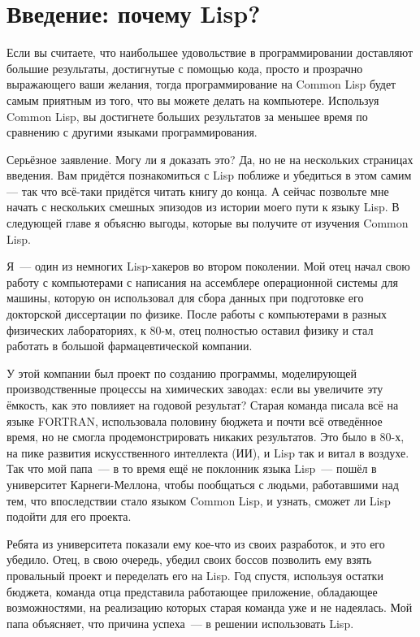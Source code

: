 \chapter{Введение: почему Lisp?}
\label{ch:01}

Если вы считаете, что наибольшее удовольствие в программировании доставляют большие
результаты, достигнутые с помощью кода, просто и прозрачно выражающего ваши желания, тогда
программирование на Common Lisp будет самым приятным из того, что вы можете делать на
компьютере. Используя Common Lisp, вы достигнете больших результатов за меньшее время по
сравнению с другими языками программирования.

Серьёзное заявление. Могу ли я доказать это? Да, но не на нескольких страницах
введения. Вам придётся познакомиться с Lisp поближе и убедиться в этом самим — так что
всё-таки придётся читать книгу до конца. А сейчас позвольте мне начать с нескольких
смешных эпизодов из истории моего пути к языку Lisp. В следующей главе я объясню выгоды,
которые вы получите от изучения Common Lisp.

Я~--- один из немногих Lisp-хакеров во втором поколении. Мой отец начал свою работу с
компьютерами с написания на ассемблере операционной системы для машины, которую он
использовал для сбора данных при подготовке его докторской диссертации по физике. После
работы с компьютерами в разных физических лабораториях, к 80-м, отец полностью оставил
физику и стал работать в большой фармацевтической компании.

У этой компании был проект по созданию программы, моделирующей производственные процессы
на химических заводах: если вы увеличите эту ёмкость, как это повлияет на годовой
результат? Старая команда писала всё на языке FORTRAN, использовала половину бюджета и
почти всё отведённое время, но не смогла продемонстрировать никаких результатов. Это было в
80-х, на пике развития искусственного интеллекта (ИИ), и Lisp так и витал в воздухе. Так что
мой папа~--- в то время ещё не поклонник языка Lisp~--- пошёл в университет Карнеги-Меллона,
чтобы пообщаться с людьми, работавшими над тем, что впоследствии стало языком Common Lisp, и
узнать, сможет ли Lisp подойти для его проекта.

Ребята из университета показали ему кое-что из своих разработок, и это его убедило. Отец,
в свою очередь, убедил своих боссов позволить ему взять провальный проект и переделать его на
Lisp. Год спустя, используя остатки бюджета, команда отца представила работающее
приложение, обладающее возможностями, на реализацию которых старая команда уже и не
надеялась. Мой папа объясняет, что причина успеха~--- в решении использовать Lisp.

